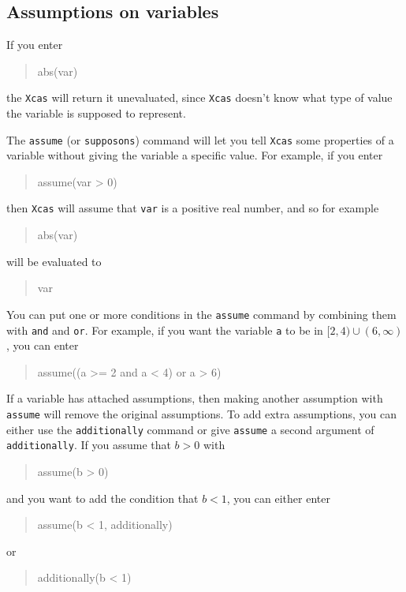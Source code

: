 \documentclass[a4paper,11pt]{book}
\newenvironment{giaccmd}
{\begin{quote}\ttfamily}
{\end{quote}}
\begin{document}
\subsection{Assumptions on variables}

If you enter
\begin{giaccmd}
  abs(var)
\end{giaccmd}
the \texttt{Xcas} will return it unevaluated, since \texttt{Xcas}
doesn't know what type of value the variable is supposed to represent.

The \texttt{assume} (or
\texttt{supposons}) command will let you tell
\texttt{Xcas} some properties of a variable without giving the
variable a specific value.  For example, if you enter
\begin{giaccmd}
  assume(var > 0)
\end{giaccmd}
then \texttt{Xcas} will assume that \texttt{var} is a positive real
number, and so for example
\begin{giaccmd}
  abs(var)
\end{giaccmd}
will be evaluated to
\begin{giaccmd}
   var
\end{giaccmd}

You can put one or more conditions in the \texttt{assume} command by
combining them with \texttt{and} and \texttt{or}.
For example, if you want the variable \texttt{a} to be in $[2,4) \cup
(6,\infty)$, you can enter
\begin{giaccmd}
  assume((a >= 2 and a < 4) or a > 6)
\end{giaccmd}

If a variable has attached assumptions, then making another assumption
with \texttt{assume} will remove the original assumptions.  To add
extra assumptions, you can either use the
\texttt{additionally} command or give
\texttt{assume} a second argument of
\texttt{additionally}.  If
you assume that $b > 0$ with
\begin{giaccmd}
  assume(b > 0)
\end{giaccmd}
and you want to add the condition that $b < 1$, you can either enter
\begin{giaccmd}
  assume(b < 1, additionally)
\end{giaccmd}
or
\begin{giaccmd}
  additionally(b < 1)
\end{giaccmd}
\end{document}
